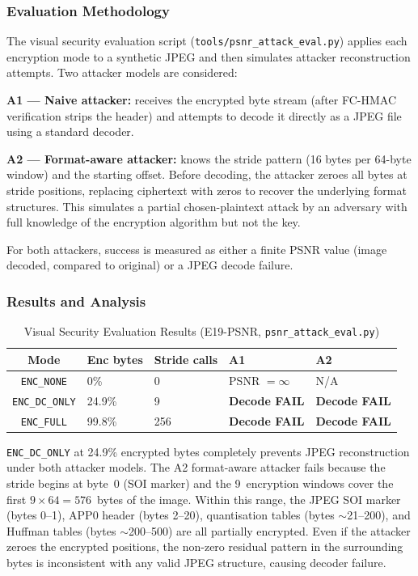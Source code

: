 \documentclass[journal]{IEEEtran}
\begin{document}
\subsubsection{Evaluation Methodology}

The visual security evaluation script (\texttt{tools/psnr\_attack\_eval.py})
applies each encryption mode to a synthetic JPEG and then simulates attacker
reconstruction attempts.  Two attacker models are considered:

\textbf{A1 --- Naive attacker:} receives the encrypted byte stream
(after FC-HMAC verification strips the header) and attempts to decode it
directly as a JPEG file using a standard decoder.

\textbf{A2 --- Format-aware attacker:} knows the stride pattern (16 bytes
per 64-byte window) and the starting offset.  Before decoding, the attacker
zeroes all bytes at stride positions, replacing ciphertext with zeros to
recover the underlying format structures.  This simulates a partial chosen-plaintext
attack by an adversary with full knowledge of the encryption algorithm but
not the key.

For both attackers, success is measured as either a finite PSNR value (image
decoded, compared to original) or a JPEG decode failure.

\subsubsection{Results and Analysis}

\begin{table}[ht]
\centering
\caption{Visual Security Evaluation Results (E19-PSNR, \texttt{psnr\_attack\_eval.py})}
\label{tab:psnr}
\begin{tabular}{cllll}
\toprule
Mode & Enc bytes & Stride calls & A1 & A2 \\
\midrule
\texttt{ENC\_NONE}    & 0\%   & 0 & PSNR $= \infty$ & N/A \\
\texttt{ENC\_DC\_ONLY}& 24.9\% & 9 & \textbf{Decode FAIL} & \textbf{Decode FAIL} \\
\texttt{ENC\_FULL}    & 99.8\% & 256 & \textbf{Decode FAIL} & \textbf{Decode FAIL} \\
\bottomrule
\end{tabular}
\end{table}

\texttt{ENC\_DC\_ONLY} at 24.9\% encrypted bytes completely prevents JPEG
reconstruction under both attacker models.  The A2 format-aware attacker fails
because the stride begins at byte~0 (SOI marker) and the 9~encryption windows
cover the first $9 \times 64 = 576$~bytes of the image.  Within this range,
the JPEG SOI marker (bytes 0--1), APP0 header (bytes 2--20), quantisation
tables (bytes $\sim$21--200), and Huffman tables (bytes $\sim$200--500) are all
partially encrypted.  Even if the attacker zeroes the encrypted positions,
the non-zero residual pattern in the surrounding bytes is inconsistent with any
valid JPEG structure, causing decoder failure.
\end{document}
